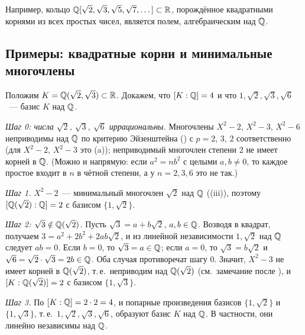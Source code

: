 Например, кольцо $\mathbb Q[\sqrt2,\sqrt3,\sqrt5,\sqrt7,\dots]\subset\mathbb R$, порождённое квадратными корнями из всех простых чисел,
является полем, алгебраическим над $\mathbb Q$.

\subsection*{Примеры: квадратные корни и минимальные многочлены}

\begin{example}
Положим $K=\mathbb Q(\sqrt2,\sqrt3)\subset\mathbb R$. Докажем, что $[K:\mathbb Q]=4$ и что $1,\sqrt2,\sqrt3,\sqrt6$~--- базис $K$ над $\mathbb Q$.

\emph{Шаг 0: числа $\sqrt2$, $\sqrt3$, $\sqrt6$ иррациональны.} Многочлены $X^2-2$, $X^2-3$, $X^2-6$ неприводимы над $\mathbb Q$ по
критерию Эйзенштейна () с $p=2$, $3$, $2$ соответственно (для $X^2-2$, $X^2-3$ это (a)); неприводимый многочлен степени $2$ не имеет корней в
$\mathbb Q$. (Можно и напрямую: если $a^2=nb^2$ с целыми $a,b\ne0$, то каждое простое входит в $n$ в чётной степени, а у $n=2,3,6$
это не так.)

\emph{Шаг 1.} $X^2-2$~--- минимальный многочлен $\sqrt2$ над $\mathbb Q$ ((iii)), поэтому $[\mathbb Q(\sqrt2):\mathbb Q]=2$ с базисом
$\{1,\sqrt2\}$.

\emph{Шаг 2: $\sqrt3\notin\mathbb Q(\sqrt2)$.} Пусть $\sqrt3=a+b\sqrt2$, $a,b\in\mathbb Q$. Возводя в квадрат, получаем
$3=a^2+2b^2+2ab\sqrt2$, и из линейной независимости $1,\sqrt2$ над $\mathbb Q$ следует $ab=0$. Если $b=0$, то $\sqrt3=a\in\mathbb Q$; если
$a=0$, то $\sqrt3=b\sqrt2$ и $\sqrt6=\sqrt2\cdot\sqrt3=2b\in\mathbb Q$. Оба случая противоречат шагу 0. Значит, $X^2-3$ не имеет
корней в $\mathbb Q(\sqrt2)$, т.\,е.\ неприводим над $\mathbb Q(\sqrt2)$ (см.\ замечание после ), и $[K:\mathbb Q(\sqrt2)]=2$ с базисом $\{1,\sqrt3\}$.

\emph{Шаг 3.} По  $[K:\mathbb Q]=2\cdot2=4$, и попарные произведения базисов $\{1,\sqrt2\}$ и $\{1,\sqrt3\}$, т.\,е.\
$1,\sqrt2,\sqrt3,\sqrt6$, образуют базис $K$ над $\mathbb Q$. В частности, они линейно независимы над $\mathbb Q$.


\end{example}
